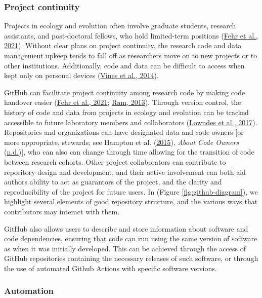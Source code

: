 \hypertarget{project-continuity}{%
\subsubsection{Project continuity}\label{project-continuity}}

Projects in ecology and evolution often involve graduate students, research assistants, and post-doctoral fellows, who hold limited-term positions (\protect\hyperlink{ref-D4C4k4ak}{Fehr et al., 2021}).
Without clear plans on project continuity, the research code and data management upkeep tends to fall off as researchers move on to new projects or to other institutions.
Additionally, code and data can be difficult to access when kept only on personal devices (\protect\hyperlink{ref-19kmNxiHc}{Vines et al., 2014}).

GitHub can facilitate project continuity among research code by making code handover easier (\protect\hyperlink{ref-D4C4k4ak}{Fehr et al., 2021}; \protect\hyperlink{ref-4ny1onB0}{Ram, 2013}).
Through version control, the history of code and data from projects in ecology and evolution can be tracked accessible to future laboratory members and collaborators (\protect\hyperlink{ref-3DKwn1sY}{Lowndes et al., 2017}).
Repositories and organizations can have designated data and code owners {[}or more appropriate, stewards; see Hampton et al. (\protect\hyperlink{ref-iIEKCTLU}{2015}), \emph{About Code Owners} (\protect\hyperlink{ref-s91uGRZ2}{n.d.}){]}, who can also can change through time allowing for the transition of code between research cohorts.
Other project collaborators can contribute to repository design and development, and their active involvement can both aid authors ability to act as guarantors of the project, and the clarity and reproducibility of the project for future users.
In (Figure \ref{fig:github-diagram}), we highlight several elements of good repository structure, and the various ways that contributors may interact with them.

GitHub also allows users to describe and store information about software and code dependencies, ensuring that code can run using the same version of software as when it was initially developed.
This can be achieved through the access of GitHub repositories containing the necessary releases of such software, or through the use of automated Github Actions with specific software versions.

\hypertarget{automation}{%
\subsubsection{Automation}\label{automation}}

